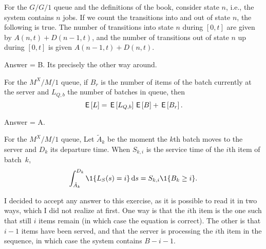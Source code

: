 \begin{exercise}[201804]
For the $G/G/1$ queue and the definitions of the book, consider state $n$, i.e., the system contains $n$ jobs. If we count the transitions into and out of state $n$, the following is true. The number of transitions into state $n$ during $[0,t]$ are given by $A(n,t) + D(n-1,t)$, and the number of transitions out of state $n$ up during $[0,t]$ is given $A(n-1,t) + D(n,t)$.
\begin{solution}
Answer = B. Its precisely the other way around. 
\end{solution}
\end{exercise}

\begin{exercise}[201804]
For the $M^X/M/1$ queue, if $B_r$ is the number of items of the batch currently at the server and $L_{Q,b}$ the number of batches in queue, then
\begin{equation*}
  \,\mathsf{E}\left[L\right] = \,\mathsf{E}\left[L_{Q,b}\right]\,\mathsf{E}\left[B\right] + \,\mathsf{E}\left[B_r\right].
\end{equation*}
\begin{solution}
Answer = A.
\end{solution}
\end{exercise}

\begin{exercise}[201804]
For the $M^X/M/1$ queue, 
Let $\tilde A_k$ be the moment the $k$th batch moves to the server and $D_k$ its departure time.  When $S_{k,i}$ is the service time of the $i$th item of batch~$k$,  
\begin{equation*}
  \int_{\tilde A_k}^{D_k} \1{L_S(s)=i} \d s = S_{k,i} \1{B_k \geq i}.
\end{equation*}
\begin{solution}
I decided to accept any answer to this exercise, as it is possible to read it in two ways, which I did not realize at first. One way is that the $i$th item is the one such that still $i$ items remain (in which case the equation is correct). The other is that $i-1$ items have been served, and that the server is processing the $i$th item in the sequence, in which case the system contains $B-i-1$.   
\end{solution}
\end{exercise}

